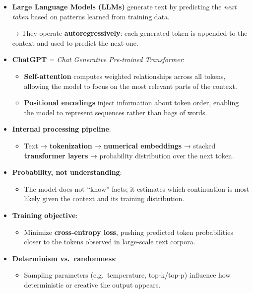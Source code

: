 \documentclass[
  letterpaper,
  DIV=11,
  numbers=noendperiod]{scrreprt}
\providecommand{\tightlist}{%
  \setlength{\itemsep}{0pt}\setlength{\parskip}{0pt}}
\begin{document}
\begin{itemize}
\item
  \textbf{Large Language Models (LLMs)} generate text by predicting the
  \emph{next token} based on patterns learned from training data.

  → They operate \textbf{autoregressively}: each generated token is
  appended to the context and used to predict the next one.
\item
  \textbf{ChatGPT} = \emph{Chat Generative Pre-trained Transformer}:

  \begin{itemize}
  \tightlist
  \item
    \textbf{Self-attention} computes weighted relationships across all
    tokens, allowing the model to focus on the most relevant parts of
    the context.
  \item
    \textbf{Positional encodings} inject information about token order,
    enabling the model to represent sequences rather than bags of words.
  \end{itemize}
\item
  \textbf{Internal processing pipeline}:

  \begin{itemize}
  \tightlist
  \item
    Text → \textbf{tokenization} → \textbf{numerical embeddings} →
    stacked \textbf{transformer layers} → probability distribution over
    the next token.
  \end{itemize}
\item
  \textbf{Probability, not understanding}:

  \begin{itemize}
  \tightlist
  \item
    The model does not ``know'' facts; it estimates which continuation
    is most likely given the context and its training distribution.
  \end{itemize}
\item
  \textbf{Training objective}:

  \begin{itemize}
  \tightlist
  \item
    Minimize \textbf{cross-entropy loss}, pushing predicted token
    probabilities closer to the tokens observed in large-scale text
    corpora.
  \end{itemize}
\item
  \textbf{Determinism vs.~randomness}:

  \begin{itemize}
  \tightlist
  \item
    Sampling parameters (e.g.~temperature, top-k/top-p) influence how
    deterministic or creative the output appears.
  \end{itemize}
\end{itemize}
\end{document}
